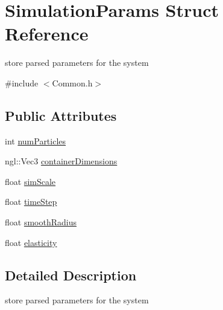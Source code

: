 \hypertarget{structSimulationParams}{
\section{SimulationParams Struct Reference}
\label{structSimulationParams}
}


store parsed parameters for the system  


{\ttfamily \#include $<$Common.h$>$}\subsection*{Public Attributes}
\begin{DoxyCompactItemize}
\item 
int \hyperlink{structSimulationParams_a55b286cb7f79ff33f9f43e02e32eead4}{numParticles}
\item 
ngl::Vec3 \hyperlink{structSimulationParams_af5b2cb0226305f4a50c3e4a0ebeef69d}{containerDimensions}
\item 
float \hyperlink{structSimulationParams_a9f81f70970bf2b1437bf6b5d7e605bd2}{simScale}
\item 
float \hyperlink{structSimulationParams_af816d0869faeba8f789e5683fb6d7afb}{timeStep}
\item 
float \hyperlink{structSimulationParams_a2516973b9fe3e512b3be4c85c821d86c}{smoothRadius}
\item 
float \hyperlink{structSimulationParams_a4621af935ec0adef1c2123e4078b4048}{elasticity}
\end{DoxyCompactItemize}


\subsection{Detailed Description}
store parsed parameters for the system 

